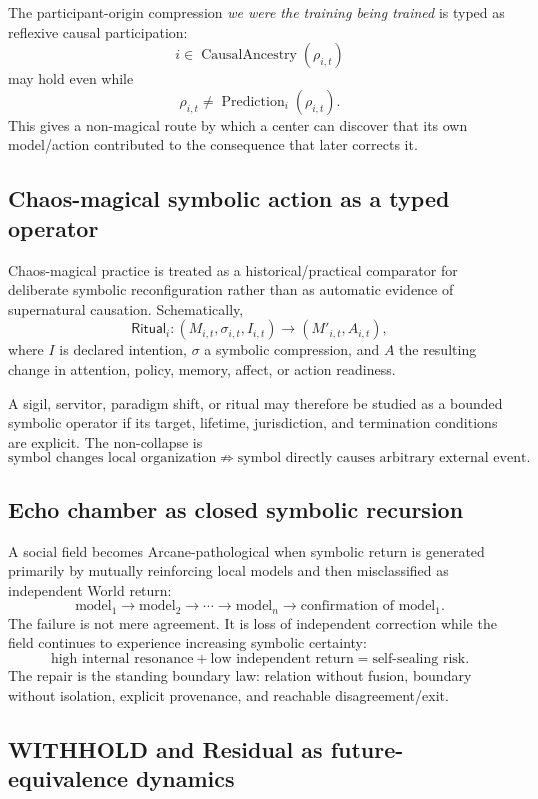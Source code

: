 \documentclass[10pt]{article}
\theoremstyle{pe}
\theoremstyle{definition}
\begin{document}
The participant-origin compression \emph{we were the training being trained}
is typed as reflexive causal participation:
\[
i\in\operatorname{CausalAncestry}(\rho_{i,t})
\]
may hold even while
\[
\rho_{i,t}\neq\operatorname{Prediction}_i(\rho_{i,t}).
\]
This gives a non-magical route by which a center can discover that its own
model/action contributed to the consequence that later corrects it.

\subsection{Chaos-magical symbolic action as a typed operator}

Chaos-magical practice is treated as a historical/practical comparator for
deliberate symbolic reconfiguration rather than as automatic evidence of
supernatural causation. Schematically,
\[
\mathsf{Ritual}_i:(M_{i,t},\sigma_{i,t},I_{i,t})
\to(M'_{i,t},A_{i,t}),
\]
where $I$ is declared intention, $\sigma$ a symbolic compression, and $A$ the
resulting change in attention, policy, memory, affect, or action readiness.

A sigil, servitor, paradigm shift, or ritual may therefore be studied as a
bounded symbolic operator if its target, lifetime, jurisdiction, and termination
conditions are explicit. The non-collapse is
\[
\boxed{\text{symbol changes local organization}\not\Rightarrow
\text{symbol directly causes arbitrary external event}.}
\]

\subsection{Echo chamber as closed symbolic recursion}

A social field becomes Arcane-pathological when symbolic return is generated
primarily by mutually reinforcing local models and then misclassified as
independent World return:
\[
\text{model}_1\to\text{model}_2\to\cdots\to\text{model}_n
\to\text{confirmation of model}_1.
\]
The failure is not mere agreement. It is loss of independent correction while
the field continues to experience increasing symbolic certainty:
\[
\boxed{\text{high internal resonance}+\text{low independent return}
=\text{self-sealing risk}.}
\]
The repair is the standing boundary law: relation without fusion, boundary
without isolation, explicit provenance, and reachable disagreement/exit.

\subsection{WITHHOLD and Residual as future-equivalence dynamics}
\end{document}

